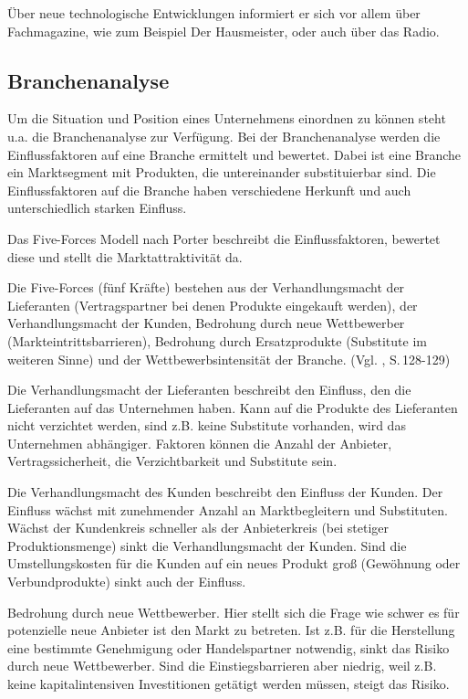         Über neue technologische Entwicklungen informiert er sich vor allem über Fachmagazine, wie zum Beispiel \as Der
        Hausmeister\adl, oder auch über das Radio.

    \subsection{Branchenanalyse} \label{Branchen}
        Um die Situation und Position eines Unternehmens einordnen zu können steht u.a. die Branchenanalyse zur
        Verfügung. Bei der Branchenanalyse werden die Einflussfaktoren auf eine Branche ermittelt und bewertet. Dabei
        ist eine Branche ein Marktsegment mit Produkten, die untereinander substituierbar sind. Die Einflussfaktoren auf
        die Branche haben verschiedene Herkunft und auch unterschiedlich starken Einfluss.

        \noindent
        Das Five-Forces Modell nach Porter beschreibt die Einflussfaktoren, bewertet diese und stellt die
        Marktattraktivität da.

        \noindent
        Die Five-Forces (fünf Kräfte) bestehen aus der Verhandlungsmacht der Lieferanten (Vertragspartner bei denen
        Produkte eingekauft werden), der Verhandlungsmacht der Kunden, Bedrohung durch neue Wettbewerber 
        (Markteintrittsbarrieren), Bedrohung durch Ersatzprodukte (Substitute im weiteren Sinne) und der
        Wettbewerbsintensität der Branche. (Vgl. \cite{Gamayanto2005}, S.\,128-129)

        \noindent
        Die Verhandlungsmacht der Lieferanten beschreibt den Einfluss, den die Lieferanten auf das Unternehmen haben.
        Kann auf die Produkte des Lieferanten nicht verzichtet werden, sind z.B. keine Substitute vorhanden, wird das 
        Unternehmen abhängiger. Faktoren können die Anzahl der Anbieter, Vertragssicherheit, die Verzichtbarkeit und
        Substitute sein.

        \noindent
        Die Verhandlungsmacht des Kunden beschreibt den Einfluss der Kunden. Der Einfluss wächst mit zunehmender Anzahl
        an Marktbegleitern und Substituten. Wächst der Kundenkreis schneller als der Anbieterkreis (bei stetiger
        Produktionsmenge) sinkt die Verhandlungsmacht der Kunden. Sind die Umstellungskosten für die Kunden auf ein
        neues Produkt groß (Gewöhnung oder Verbundprodukte) sinkt auch der Einfluss.

        \noindent
        Bedrohung durch neue Wettbewerber. Hier stellt sich die Frage wie schwer es für potenzielle neue Anbieter ist
        den Markt zu betreten. Ist z.B. für die Herstellung eine bestimmte Genehmigung oder Handelspartner notwendig,
        sinkt das Risiko durch neue Wettbewerber. Sind die Einstiegsbarrieren aber niedrig, weil z.B. keine 
        kapitalintensiven Investitionen getätigt werden müssen, steigt das Risiko.

